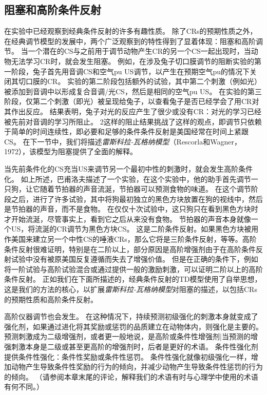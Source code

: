 \subsection{阻塞和高阶条件反射} \label{sec:blocking_higher_order}

在实验中已经观察到经典条件反射的许多有趣性质。
除了CRs的预期性质之外，在经典调节模型的发展中，两个广泛观察到的特性得到了显着体现：阻塞和高阶调节。
当一个潜在的CS与之前用于调节动物产生CR的另一个CS一起出现时，当动物无法学习CR时，就会发生阻塞。
例如，在涉及兔子切口膜调节的阻断实验的第一阶段，兔子首先用音调CS和空气pu US调节，以产生在预期空气pu的情况下关闭其切口膜的CR。
实验的第二阶段包括额外的试验，其中第二个刺激（例如光）被添加到音调中以形成复合音调/光CS，然后是相同的空气pu US。
在实验的第三阶段，仅第二个刺激（即光）被呈现给兔子，以查看兔子是否已经学会了用CR对其作出反应。
结果表明，兔子对光的反应产生了很少或没有CR：对光的学习已经被先前对音调的学习所阻止。
2这样的阻止结果挑战了这样的观点，即调节只依赖于简单的时间连续性，即必要和足够的条件条件反射是美国经常在时间上紧跟CS。
在下一节中，我们将描述\textit{雷斯科拉-瓦格纳模型}（Rescorla和Wagner，1972），该模型为阻塞提供了全面的解释。
	


当先前条件化的CS充当US来调节另一个最初中性的刺激时，就会发生高阶条件化。
如上所述，巴甫洛夫描述了一个实验，在这个实验中，他的助手首先调节一只狗，让它随着节拍器的声音流涎，节拍器可以预测食物的味道。
在这个调节阶段之后，进行了许多试验，其中将狗最初独立的黑色方块放置在狗的视线中，然后是节拍器的声音，而不是食物。
在仅仅十次试验中，这只狗只在看到黑色方块时才开始流涎，尽管事实上，看到它之后从来没有食物。
节拍器的声音本身就像一个US，将流涎的CR调节为黑色方块CS。
这是二阶条件反射。如果黑色方块被用作美国来建立另一个中性CS的唾液CRs，那么它将是三阶条件反射，等等。高阶条件反射很难证明，特别是在二阶以上，部分原因是高阶增强剂由于在高阶条件反射试验中没有被原美国反复遵循而失去了增强价值。
但是在正确的条件下，例如将一阶试验与高阶试验混合或通过提供一般的激励刺激，可以证明二阶以上的高阶条件反射。
正如我们在下面所描述的，经典条件反射的TD模型使用了自举思想，这是我们的方法的核心，以扩展\textit{雷斯科拉-瓦格纳模型}对阻塞的描述，以包括CRs的预期性质和高阶条件反射。
	
	
高阶仪器调节也会发生。
在这种情况下，持续预测初级强化的刺激本身就变成了强化剂，如果通过进化将其奖励或惩罚的品质建立在动物体内，则强化是主要的。
预测刺激成为二级增强剂，或者更一般地说，是高阶或条件性增强剂|当预测的增强刺激本身是二级或甚至更高阶的增强剂时，后者是更好的术语。
条件性强化剂提供条件性强化：条件性奖励或条件性惩罚。
条件性强化就像初级强化一样，增加动物产生导致条件性奖励的行为的倾向，并减少动物产生导致条件性惩罚的行为的倾向。
（请参阅本章末尾的评论，解释我们的术语有时与心理学中使用的术语有何不同。）



